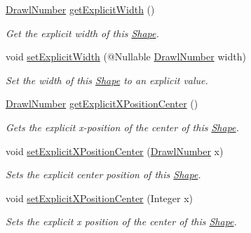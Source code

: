 \begin{DoxyCompactItemize}
\hyperlink{classcom_1_1aarrelaakso_1_1drawl_1_1_drawl_number}{Drawl\+Number} \hyperlink{classcom_1_1aarrelaakso_1_1drawl_1_1_shape_aabb6ac3a04620e1c760bcea54797cba8}{get\+Explicit\+Width} ()
\begin{DoxyCompactList}\small\item\em Get the explicit width of this \hyperlink{classcom_1_1aarrelaakso_1_1drawl_1_1_shape}{Shape}. \end{DoxyCompactList}\item 
void \hyperlink{classcom_1_1aarrelaakso_1_1drawl_1_1_shape_a71f8f1c75ff6eb7f2c4b4d80c80a665a}{set\+Explicit\+Width} (@Nullable \hyperlink{classcom_1_1aarrelaakso_1_1drawl_1_1_drawl_number}{Drawl\+Number} width)
\begin{DoxyCompactList}\small\item\em Set the width of this \hyperlink{classcom_1_1aarrelaakso_1_1drawl_1_1_shape}{Shape} to an explicit value. \end{DoxyCompactList}\item 
\hyperlink{classcom_1_1aarrelaakso_1_1drawl_1_1_drawl_number}{Drawl\+Number} \hyperlink{classcom_1_1aarrelaakso_1_1drawl_1_1_shape_aaecae2f51794b77ff2f76b1be64b0d90}{get\+Explicit\+X\+Position\+Center} ()
\begin{DoxyCompactList}\small\item\em Gets the explicit x-\/position of the center of this \hyperlink{classcom_1_1aarrelaakso_1_1drawl_1_1_shape}{Shape}. \end{DoxyCompactList}\item 
void \hyperlink{classcom_1_1aarrelaakso_1_1drawl_1_1_shape_a43d67e2711163383c32d8c14a6b17e2c}{set\+Explicit\+X\+Position\+Center} (\hyperlink{classcom_1_1aarrelaakso_1_1drawl_1_1_drawl_number}{Drawl\+Number} x)
\begin{DoxyCompactList}\small\item\em Sets the explicit center position of this \hyperlink{classcom_1_1aarrelaakso_1_1drawl_1_1_shape}{Shape}. \end{DoxyCompactList}\item 
void \hyperlink{classcom_1_1aarrelaakso_1_1drawl_1_1_shape_aa7855df6d98b3bfa556b7d857755181b}{set\+Explicit\+X\+Position\+Center} (Integer x)
\begin{DoxyCompactList}\small\item\em Sets the explicit x position of the center of this \hyperlink{classcom_1_1aarrelaakso_1_1drawl_1_1_shape}{Shape}. \end{DoxyCompactList}\item 

\end{DoxyCompactItemize}
